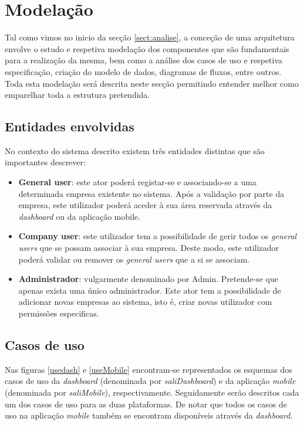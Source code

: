 \section{Modelação}

Tal como vimos no inicio da secção \ref{sect:analise}, a conceção de uma arquitetura envolve o estudo e respetiva modelação dos componentes que são fundamentais para a realização da mesma, bem como a análise dos casos de uso e respetiva especificação, criação do modelo de dados, diagramas de fluxos, entre outros. Toda esta modelação será descrita neste secção permitindo entender melhor como emparelhar toda a estrutura pretendida. 



\subsection{Entidades envolvidas}


No contexto do sistema descrito existem três entidades distintas que são importantes descrever: 

\begin{itemize}
	
	\item \textbf{General user}: este ator poderá registar-se e associando-se a uma determinada empresa existente no sistema. Após a validação por parte da empresa, este utilizador poderá aceder à sua área reservada através da \textit{dashboard} ou da aplicação mobile. 
	
	\item \textbf{Company user}: este utilizador tem a possibilidade de gerir todos os \textit{general users} que se possam associar à sua empresa. Deste modo, este utilizador poderá validar ou remover os \textit{general users} que a si se associam. 
	
	\item \textbf{Administrador}: vulgarmente denominado por Admin. Pretende-se que apenas exista uma único administrador. Este ator tem a possibilidade de adicionar novas empresas ao sistema, isto é, criar novas utilizador com permissões especificas. 
	
\end{itemize}




\subsection{Casos de uso}


Nas figuras \ref{usedash} e \ref{useMobile} encontram-se representados os esquemas dos casos de uso da \textit{dashboard} (denominada por \textit{saliDashboard}) e da aplicação \textit{mobile} (denominada por \textit{saliMobile}), respectivamente.
Seguidamente serão descritos cada um dos casos de uso para as duas plataformas. De notar que todos os casos de uso na aplicação \textit{mobile} também se encontram disponíveis através da \textit{dashboard}. 
\newpage

